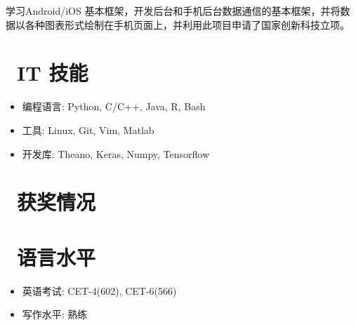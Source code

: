 \documentclass{resume}
\begin{document}
学习Android/iOS 基本框架，开发后台和手机后台数据通信的基本框架，并将数据以各种图表形式绘制在手机页面上，并利用此项目申请了国家创新科技立项。




\section{\faCogs\ IT 技能}
\begin{itemize}[parsep=0.5ex]
  \item 编程语言: Python, C/C++, Java, R, Bash
  \item 工具: Linux, Git, Vim, Matlab
  \item 开发库: Theano, Keras, Numpy, Tensorflow
\end{itemize}

\section{\faStar\ 获奖情况}


\section{\faInfo\ 语言水平}
\begin{itemize}[parsep=0.5ex]
  \item 英语考试: CET-4(602), CET-6(566)
  \item 写作水平: 熟练
\end{itemize}

%
%
\end{document}
